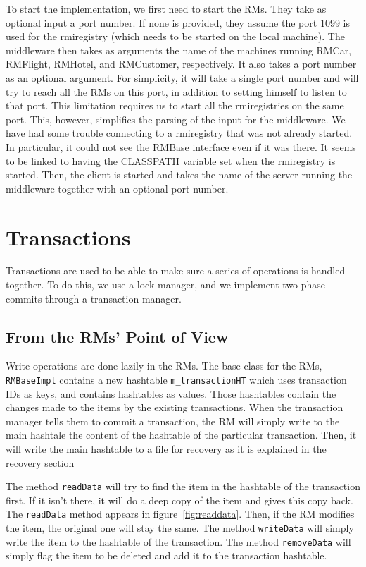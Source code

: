 \documentclass[12pt]{article}
\theoremstyle{plain}%
\theoremstyle{definition}
\theoremstyle{remark}
\newcommand{\java}[1]{{\lstinline!#1!}}
\begin{document}
To start the implementation, we first need to start the RMs. They take
as optional input a port number. If none is provided, they assume the
port 1099 is used for the rmiregistry (which needs to be started on
the local machine). The middleware then takes as arguments the name of
the machines running RMCar, RMFlight, RMHotel, and RMCustomer,
respectively. It also takes a port number as an optional argument. For
simplicity, it will take a single port number and will try to reach
all the RMs on this port, in addition to setting himself to listen to
that port. This limitation requires us to start all the rmiregistries
on the same port. This, however, simplifies the parsing of the input
for the middleware. We have had some trouble connecting to a
rmiregistry that was not already started. In particular, it could not
see the RMBase interface even if it was there. It seems to be linked to
having the CLASSPATH variable set when the rmiregistry is started.
Then, the client is started and takes the name of the server running
the middleware together with an optional port number.

\section{Transactions}

Transactions are used to be able to make sure a series of operations is 
handled together. To do this, we use a lock manager, and we implement
two-phase commits through a transaction manager.

\subsection*{From the RMs' Point of View\label{sec:rm}}

Write operations are done lazily in the RMs. The base class for the RMs, 
\java{RMBaseImpl} contains a new hashtable \java{m_transactionHT} which 
uses transaction IDs as keys, and contains hashtables as values. Those 
hashtables contain the changes made to the items by the existing 
transactions. When the transaction manager tells them to commit a 
transaction, the RM will simply write to the main hashtale the content 
of the hashtable of the particular transaction. Then, it will write
the main hashtable to a file for recovery as it is explained in the
recovery section %

The method \java{readData} will try to find the item in the hashtable 
of the transaction first. If it isn't there, it will do a deep copy of 
the item and gives this copy back. The \java{readData} method appears
in figure~\ref{fig:readdata}. Then, if the RM modifies the item, 
the original one will stay the same. The method \java{writeData} will 
simply write the item to the hashtable of the transaction. The method 
\java{removeData} will simply flag the item to be deleted and add it 
to the transaction hashtable.
\end{document}
